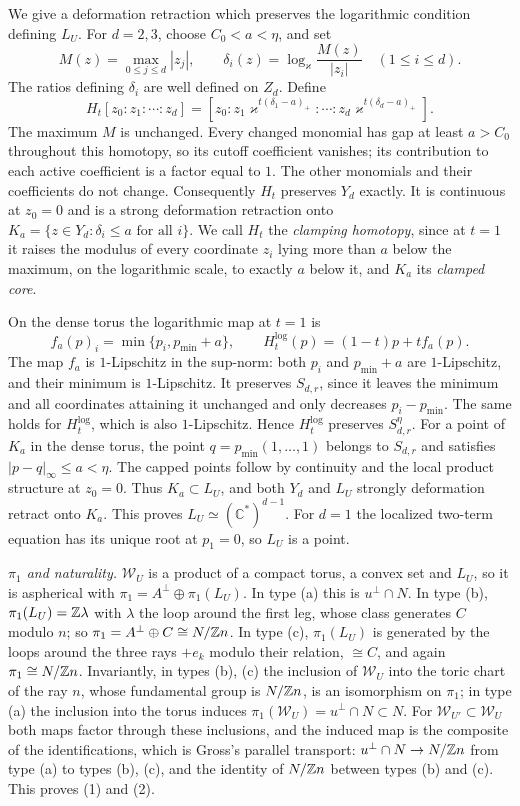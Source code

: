 We give a deformation retraction which preserves the logarithmic condition defining $L_U$.
For $d=2,3$, choose $C_0<a<\eta$, and set
\[
 M(z)=\max_{0\le j\le d}|z_j|,\qquad
 \delta_i(z)=\log_\varkappa\frac{M(z)}{|z_i|}\quad(1\le i\le d).
\]
The ratios defining $\delta_i$ are well defined on $Z_d$. Define
\[
 H_t[z_0:z_1:\cdots:z_d]
   =[z_0:z_1\varkappa^{t(\delta_1-a)_+}:\cdots:z_d\varkappa^{t(\delta_d-a)_+}].
\]
The maximum $M$ is unchanged. Every changed monomial has gap at least $a>C_0$
throughout this homotopy, so its cutoff coefficient vanishes; its contribution
to each active coefficient is a factor equal to $1$. The other monomials and
their coefficients do not change. Consequently $H_t$ preserves $Y_d$ exactly.
It is continuous at $z_0=0$ and is a strong deformation retraction onto
$K_a=\{z\in Y_d:\delta_i\le a\text{ for all }i\}$. We call $H_t$ the \emph{clamping homotopy}, since at $t=1$ it raises
the modulus of every coordinate $z_i$ lying more than $a$ below the maximum, on the logarithmic scale, to exactly $a$
below it, and $K_a$ its \emph{clamped core}.

On the dense torus the logarithmic map at $t=1$ is
\[
 f_a(p)_i=\min\{p_i,p_{\min}+a\},\qquad
 H_t^{\log}(p)=(1-t)p+t f_a(p).
\]
The map $f_a$ is $1$-Lipschitz in the sup-norm: both $p_i$ and $p_{\min}+a$ are
$1$-Lipschitz, and their minimum is $1$-Lipschitz. It preserves $S_{d,r}$,
since it leaves the minimum and all coordinates attaining it unchanged and
only decreases $p_i-p_{\min}$. The same holds for $H_t^{\log}$, which is also
$1$-Lipschitz. Hence $H_t^{\log}$ preserves $S_{d,r}^{\eta}$.
For a point of $K_a$ in the dense torus, the point
$q=p_{\min}(1,\ldots,1)$ belongs to $S_{d,r}$ and satisfies
$|p-q|_\infty\le a<\eta$. The capped points follow by continuity and the local
product structure at $z_0=0$. Thus $K_a\subset L_U$, and both $Y_d$ and $L_U$
strongly deformation retract onto $K_a$. This proves
$L_U\simeq(\mathbb C^*)^{d-1}$.
For $d=1$ the localized two-term equation has its unique root at $p_1=0$,
so $L_U$ is a point.


\emph{$\pi_1$ and naturality.} $\mathscr W_U$ is a product of a compact torus, a convex set and $L_U$, so it is aspherical with $\pi_1=A^\perp\oplus\pi_1(L_U)$. In type (a) this is $u^\perp\cap N$. In type (b), $\pi_1(L_U)=\mathbb Z\lambda$ with $\lambda$ the loop around the first leg, whose class generates $C$ modulo $n$; so $\pi_1=A^\perp\oplus C\cong N/\mathbb Z n$. In type (c), $\pi_1(L_U)$ is generated by the loops around the three rays $+e_k$ modulo their relation, $\cong C$, and again $\pi_1\cong N/\mathbb Z n$. Invariantly, in types (b), (c) the inclusion of $\mathscr W_U$ into the toric chart of the ray $n$, whose fundamental group is $N/\mathbb Z n$, is an isomorphism on $\pi_1$; in type (a) the inclusion into the torus induces $\pi_1(\mathscr W_U)=u^\perp\cap N\subset N$. For $\mathscr W_{U'}\subset \mathscr W_U$ both maps factor through these inclusions, and the induced map is the composite of the identifications, which is Gross's parallel transport: $u^\perp\cap N\to N/\mathbb Z n$ from type (a) to types (b), (c), and the identity of $N/\mathbb Z n$ between types (b) and (c). This proves (1) and (2).

